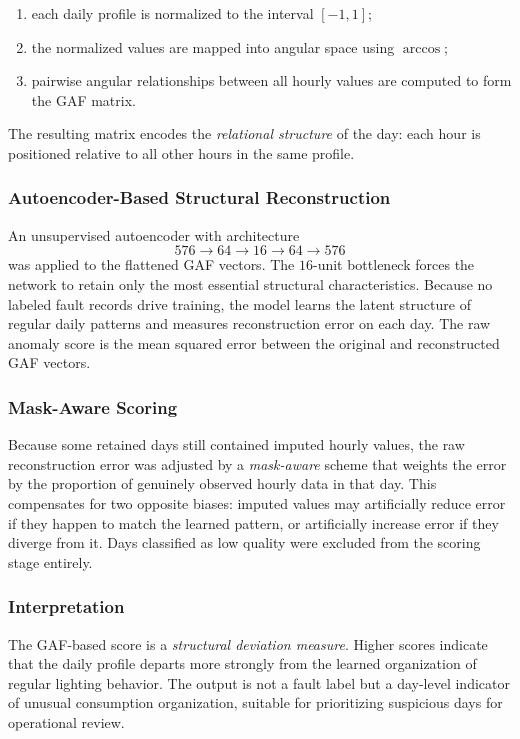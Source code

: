 \documentclass[11pt]{article}
\begin{document}
\begin{enumerate}[leftmargin=1.5em,itemsep=1pt]
  \item each daily profile is normalized to the interval $[-1,1]$;
  \item the normalized values are mapped into angular space using $\arccos$;
  \item pairwise angular relationships between all hourly values are computed to form the GAF matrix.
\end{enumerate}

The resulting matrix encodes the \emph{relational structure} of the day: each hour is positioned relative to all other hours in the same profile.

\subsubsection*{Autoencoder-Based Structural Reconstruction}
An unsupervised autoencoder with architecture
\[
  576 \rightarrow 64 \rightarrow 16 \rightarrow 64 \rightarrow 576
\]
was applied to the flattened GAF vectors. The $16$-unit bottleneck forces the network to retain only the most essential structural characteristics. Because no labeled fault records drive training, the model learns the latent structure of regular daily patterns and measures reconstruction error on each day. The raw anomaly score is the mean squared error between the original and reconstructed GAF vectors.

\subsubsection*{Mask-Aware Scoring}
Because some retained days still contained imputed hourly values, the raw reconstruction error was adjusted by a \emph{mask-aware} scheme that weights the error by the proportion of genuinely observed hourly data in that day. This compensates for two opposite biases: imputed values may artificially reduce error if they happen to match the learned pattern, or artificially increase error if they diverge from it. Days classified as low quality were excluded from the scoring stage entirely.

\subsubsection*{Interpretation}
The GAF-based score is a \emph{structural deviation measure}. Higher scores indicate that the daily profile departs more strongly from the learned organization of regular lighting behavior. The output is not a fault label but a day-level indicator of unusual consumption organization, suitable for prioritizing suspicious days for operational review.
\end{document}
